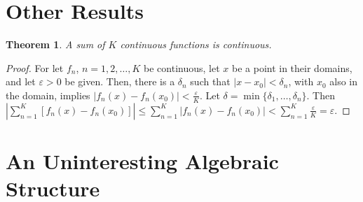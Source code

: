 \documentclass[crop=false,class=book]{standalone}
\theoremstyle{mystyle}
\newtheorem{theorem}{Theorem}[section]
\begin{document}
\section{Other Results}
\begin{theorem}
A sum of $K$ continuous functions is continuous. 
\end{theorem}
\begin{proof}
For let $f_n$, $n=1,2,\hdots,K$ be continuous, let $x$ be a point in their domains, and let $\varepsilon>0$ be given. Then, there is a $\delta_n$ such that $|x-x_0|<\delta_n$, with $x_0$ also in the domain, implies $|f_n(x)-f_n(x_0)|<\frac{\varepsilon}{K}$. Let $\delta = \min\{\delta_1,\hdots,\delta_n\}$. Then $|\sum_{n=1}^{K}[f_n(x)-f_n(x_0)]| \leq \sum_{n=1}^{K}|f_n(x)-f_n(x_0)| < \sum_{n=1}^{K} \frac{\varepsilon}{K} = \varepsilon$.
\end{proof}
\section{An Uninteresting Algebraic Structure}
\end{document}
